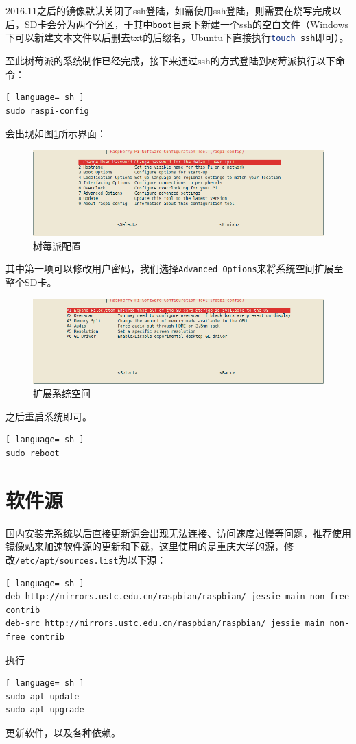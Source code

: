 		\par 2016.11之后的镜像默认关闭了ssh登陆，如需使用ssh登陆，则需要在烧写完成以后，SD卡会分为两个分区，于其中\lstinline[language=sh]{boot}目录下新建一个ssh的空白文件（Windows下可以新建文本文件以后删去txt的后缀名，Ubuntu下直接执行\lstinline[language=sh]{touch ssh}即可）。
		\par 至此树莓派的系统制作已经完成，接下来通过ssh的方式登陆到树莓派执行以下命令：
		\begin{lstlisting}[ language= sh ]
sudo raspi-config
		\end{lstlisting}
		\par 会出现如图\ref{fig:raspi_config}所示界面：
		\begin{figure}[htp]
			\centering
			\includegraphics[width=13cm]{figures/raspi-config.png}
			\caption{树莓派配置}
			\label{fig:raspi_config}
		\end{figure}
		\par 其中第一项可以修改用户密码，我们选择\lstinline{Advanced Options}来将系统空间扩展至整个SD卡。
		\begin{figure}[htp]
			\centering
			\includegraphics[width=13cm]{figures/raspi-config-expand-filesystem.png}
			\caption{扩展系统空间}
			\label{fig:raspi_config_expand_filesystem}
		\end{figure}
		\par 之后重启系统即可。
		\begin{lstlisting}[ language= sh ]
sudo reboot
		\end{lstlisting}
	\section{软件源}
		\par 国内安装完系统以后直接更新源会出现无法连接、访问速度过慢等问题，推荐使用镜像站来加速软件源的更新和下载，这里使用的是重庆大学的源，修改\lstinline[language=sh]{/etc/apt/sources.list}为以下源：
		\begin{lstlisting}[ language= sh ]
deb http://mirrors.ustc.edu.cn/raspbian/raspbian/ jessie main non-free contrib 
deb-src http://mirrors.ustc.edu.cn/raspbian/raspbian/ jessie main non-free contrib
		\end{lstlisting}
		\par 执行
		\begin{lstlisting}[ language= sh ]
sudo apt update
sudo apt upgrade
		\end{lstlisting}
		\par 更新软件，以及各种依赖。
